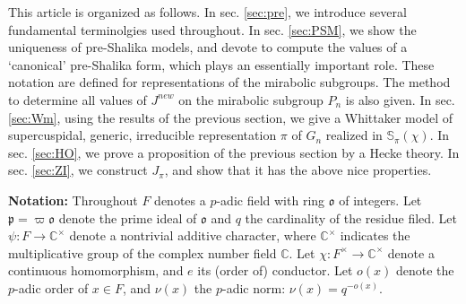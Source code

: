 \documentclass[11pt]{amsart}
\newcommand\Vp{\varpi}%
\newcommand\vp{\varphi}%
\newcommand\oo{\mathfrak{o}}
\newcommand\p{{\mathfrak{p}}}
\newcommand\C{{\mathbb{C}}}%
\newcommand\Sb{{\mathbb{S}}}
\newcommand\1{\mathbf{1}}
\newcommand\tm{\times}
\numberwithin{equation}{section}
\begin{document}
This article is organized as follows.
In sec. \ref{sec:pre}, we introduce several fundamental terminolgies used throughout. 
In sec. \ref{sec:PSM}, we show the uniqueness of pre-Shalika models, and devote to compute the values of  a `canonical' pre-Shalika form, which plays an essentially important role.
These notation are defined for representations of the mirabolic subgroups.
The method to determine all values of $J^{new}$ on the mirabolic subgroup $P_{n}$ is also given.
In sec. \ref{sec:Wm}, using the results of the previous section, we give a Whittaker model of supercuspidal, generic, irreducible representation $\pi$ of $G_n$ realized in $\Sb_\pi(\chi)$.
In sec. \ref{sec:HO}, we prove a proposition of the previous section by a Hecke theory.
In sec. \ref{sec:ZI}, we construct $J_\pi$, and show that it has the above nice properties.

{\bf Notation:} 
Throughout $F$ denotes a $p$-adic field with ring $\oo$ of integers.
Let $\p = \Vp \oo$ denote the prime ideal of $\oo$ and $q$ the cardinality of the residue filed.
Let $\psi: F \to \C^\tm$ denote a nontrivial additive character, where $\C^\tm$ indicates the multiplicative group of the complex number field $\C$.
Let $\chi: F^\tm \to \C^\tm$ denote a continuous homomorphism, and $e$ its (order of) conductor.
Let $o(x)$ denote the $p$-adic order of $x \in F$, and $\nu(x)$ the $p$-adic norm: $\nu(x) = q^{-o(x)}$.
\end{document}
